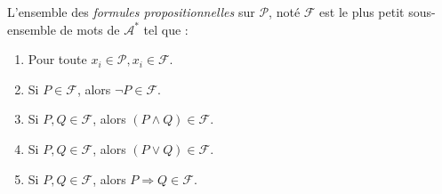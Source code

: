 \begin{definition}
    L'ensemble des \emph{formules propositionnelles} sur $ \mathcal{P}$, noté $ \mathcal{F}$ est le 
    plus petit sous-ensemble de mots de $ \mathcal{A}^*$ tel que : 
    \begin{enumerate}[label=\roman*)]
        \item Pour toute $ x_i \in \mathcal{ P}, x_i \in \mathcal{F}$. 
        \item Si $ P \in \mathcal{F}$, alors $ \lnot P \in \mathcal{F}$. 
        \item Si $ P, Q \in \mathcal{F}$, alors $ (P \land Q) \in \mathcal{F}$. 
        \item Si $ P, Q \in \mathcal{F}$, alors $ (P \lor Q) \in \mathcal{F}$. 
        \item Si $ P, Q \in \mathcal{F}$, alors $ P \Rightarrow Q \in \mathcal{F}$. 
    \end{enumerate}
\end{definition}





